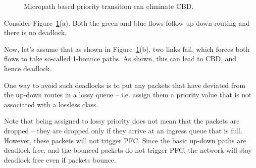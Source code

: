 \begin{figure}[t]
	\centering
	

	
	
	\caption{Micropath based priority transition can eliminate CBD.}\label{fig:priority_transition}
\end{figure}

Consider Figure~\ref{fig:priority_transition}(a). Both the green and blue flows
follow up-down routing and there is no deadlock. 

Now, let's assume that as shown in Figure~\ref{fig:priority_transition}(b), two
links fail, which forces both flows to take so-called 1-bounce paths. As shown,
this can lead to CBD, and hence deadlock.

One way to avoid such deadlocks is to put any packets that have deviated from
the up-down routes in a lossy queue -- i.e. assign them a priority value that is
not associated with a lossless class.  

Note that being assigned to lossy priority does not mean that the packets are
dropped -- they are dropped only if they arrive at an ingress queue that is
full. However, these packets will not trigger PFC. Since the basic up-down paths
are deadlock free, and the bounced packets do not trigger PFC, the network will
stay deadlock free even if packets bounce.

